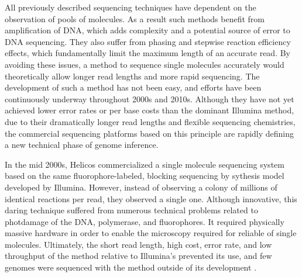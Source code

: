 All previously described sequencing techniques have dependent on the observation of pools of molecules.
As a result such methods benefit from amplification of DNA, which adds complexity and a potential source of error to DNA sequencing.
They also suffer from phasing and stepwise reaction efficiency effects, which fundamentally limit the maximum length of an accurate read.
By avoiding these issues, a method to sequence single molecules accurately would theoretically allow longer read lengths and more rapid sequencing.
The development of such a method has not been easy, and efforts have been continuously underway throughout 2000s and 2010s.
Although they have not yet achieved lower error rates or per base costs than the dominant Illumina method, due to their dramatically longer read lengths and flexible sequencing chemistries, the commercial sequencing platforms based on this principle are rapidly defining a new technical phase of genome inference.

In the mid 2000s, Helicos commercialized a single molecule sequencing system based on the same fluorophore-labeled, blocking sequencing by sythesis model developed by Illumina.
However, instead of observing a colony of millions of identical reactions per read, they observed a single one.
Although innovative, this daring technique suffered from numerous technical problems related to photdamage of the DNA, polymerase, and fluorophores.
It required physically massive hardware in order to enable the microscopy required for reliable of single molecules.
Ultimately, the short read length, high cost, error rate, and low throughput of the method relative to Illumina's prevented its use, and few genomes were sequenced with the method outside of its development \cite{harris2008single}.

